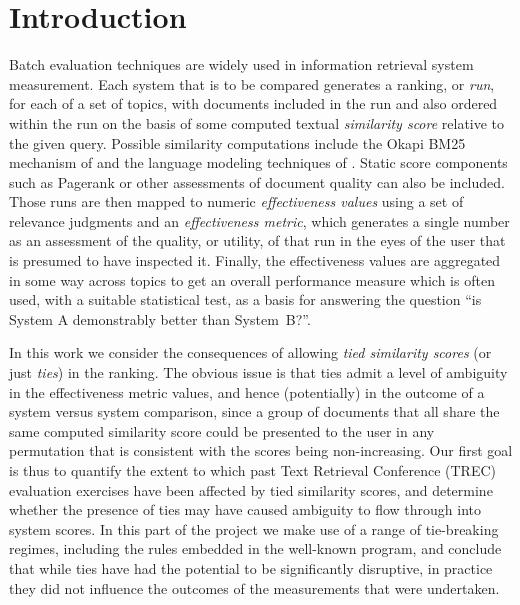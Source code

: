 \section{Introduction}
\label{sec-intro}

Batch evaluation techniques are widely used in information retrieval
system measurement.
Each system that is to be compared generates a ranking, or
{\emph{run}}, for each of a set of topics, with documents included in
the run and also ordered within the run on the basis of some computed
textual {\emph{similarity score}} relative to the given query.
Possible similarity computations include the Okapi BM25 mechanism of
{\citet{rwjhg94trec}} and the language modeling techniques of
{\citet{pc98sigir}}.
Static score components such as Pagerank or other assessments of
document quality can also be included.
Those runs are then mapped to numeric {\emph{effectiveness values}}
using a set of relevance judgments and an {\emph{effectiveness
metric}}, which generates a single number as an assessment of the
quality, or utility, of that run in the eyes of the user that is
presumed to have inspected it.
Finally, the effectiveness values are aggregated in some way across
topics to get an overall performance measure which is often used,
with a suitable statistical test, as a basis for answering the
question ``is System A demonstrably better than System~B?''.

In this work we consider the consequences of allowing {\emph{tied
similarity scores}} (or just {\emph{ties}}) in the ranking.
The obvious issue is that ties admit a level of ambiguity in the
effectiveness metric values, and hence (potentially) in the outcome
of a system versus system comparison, since a group of documents that
all share the same computed similarity score could be presented to
the user in any permutation that is consistent with the scores being
non-increasing.
Our first goal is thus to quantify the extent to which past Text
Retrieval Conference (TREC) evaluation exercises have been affected
by tied similarity scores, and determine whether the presence of
ties may have caused ambiguity to flow through into system
scores.
In this part of the project we make use of a range of tie-breaking
regimes, including the rules embedded in the well-known
{\treceval} program, and conclude that while ties have had the
potential to be significantly disruptive, in practice they did not
influence the outcomes of the measurements that were undertaken.

